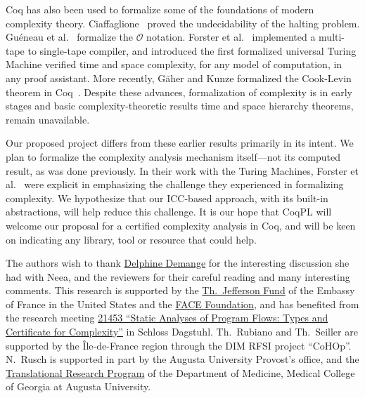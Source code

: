 \documentclass[sigplan,screen,timestamp,%
nonacm]{acmart}
\begin{document}
Coq has also been used to formalize some of the foundations of modern complexity theory.
Ciaffaglione~\cite{Ciaffaglione2016} proved the undecidability of the halting problem.
Gu{\'e}neau et al.~\cite{Gueneau2018} formalize the \(\mathcal{O}\) notation.
Forster et al.~\cite{Forster2020} implemented a multi-tape to single-tape compiler, and
introduced the first formalized universal Turing Machine verified \wrt time and space complexity, for any model of computation, in any proof assistant.
More recently, G\"{a}her and Kunze formalized the Cook-Levin theorem in Coq~\cite{Gaher2021}.
Despite these advances, formalization of complexity is in early stages and basic complexity-theoretic
results \eg time and space hierarchy theorems, remain unavailable.

Our proposed project differs from these earlier results primarily in its intent.
We plan to formalize the complexity analysis mechanism itself---not its computed result, as was done previously.
In their work with the Turing Machines, Forster et al.~\cite{Forster2020} were explicit
in emphasizing the challenge they experienced in formalizing complexity.
We hypothesize that our ICC-based approach, with \eg its built-in abstractions, will help reduce this challenge.
It is our hope that CoqPL will welcome our proposal for a certified complexity analysis in Coq, and will be keen on indicating any library, tool or resource that could help.

\begin{acks}
	The authors wish to thank \href{http://people.rennes.inria.fr/Delphine.Demange/}{Delphine Demange} for the interesting discussion she had with Neea, and the reviewers for their careful reading and many interesting comments.
	This research is supported by the \href{https://face-foundation.org/transatlantic-study-research/transatlantic-research-partnership/}{Th.\ Jefferson Fund} of the Embassy of France in the United States and the \href{https://face-foundation.org/}{FACE Foundation}, and has benefited from the research meeting \href{https://www.dagstuhl.de/de/programm/kalender/evhp/?semnr=21453}{21453 \enquote{Static Analyses of Program Flows: Types and Certificate for Complexity}} in Schloss Dagstuhl. Th.\ Rubiano and Th.\ Seiller are supported by the Île-de-France region through the DIM RFSI project \enquote{CoHOp}.
	N.\ Rusch is supported in part by the Augusta University Provost's office, and the \href{https://www.augusta.edu/mcg/medicine/research/trp/about-srp.php}{Translational Research Program} of the Department of Medicine, Medical College of Georgia at Augusta University.
\end{acks}



\end{document}
